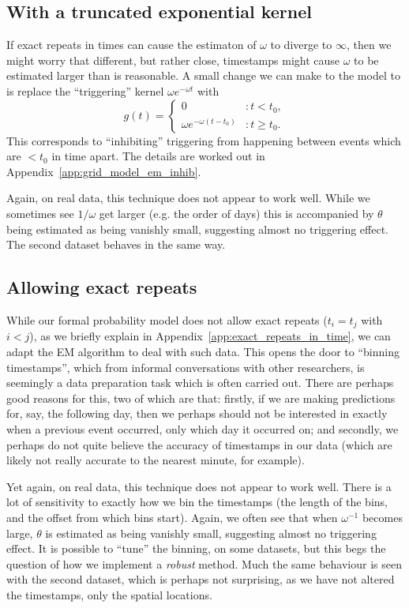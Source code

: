 \documentclass[twoside,a4paper]{article}
\theoremstyle{plain}
\theoremstyle{definition}
\begin{document}
\subsection{With a truncated exponential kernel}

If exact repeats in times can cause the estimaton of $\omega$ to diverge to $\infty$,
then we might worry that different, but rather close, timestamps might cause $\omega$ to
be estimated larger than is reasonable.  A small change we can make to the model to is
replace the ``triggering'' kernel $\omega e^{-\omega t}$ with 
\[ g(t) = \begin{cases} 0 &: t<t_0, \\ \omega e^{-\omega(t-t_0)} &: t\geq t_0.
\end{cases} \]
This corresponds to ``inhibiting'' triggering from happening between events which are
$<t_0$ in time apart.  The details are worked out in Appendix~\ref{app:grid_model_em_inhib}.

Again, on real data, this technique does not appear to work well.  While we sometimes
see $1/\omega$ get larger (e.g. the order of days) this is accompanied by $\theta$ being
estimated as being vanishly small, suggesting almost no triggering effect.
The second dataset behaves in the same way.



\subsection{Allowing exact repeats}\label{sec:exact_repeats}

While our formal probability model does not allow exact repeats ($t_i=t_j$ with $i<j$),
as we briefly explain in Appendix~\ref{app:exact_repeats_in_time}, we can adapt the EM
algorithm to deal with such data.  This opens the door to ``binning timestamps'', which
from informal conversations with other researchers, is seemingly a data preparation task
which is often carried out.  There are perhaps good reasons for this, two of which are
that: firstly, if we are making predictions for, say, the following day, then we perhaps
should not be interested in exactly when a previous event occurred, only which day it
occurred on; and secondly, we perhaps do not quite believe the accuracy of timestamps in
our data (which are likely not really accurate to the nearest minute, for example).

Yet again, on real data, this technique does not appear to work well.  There is a lot of
sensitivity to exactly how we bin the timestamps (the length of the bins, and the offset
from which bins start).  Again, we often see that when $\omega^{-1}$ becomes large,
$\theta$ is estimated as being vanishly small, suggesting almost no triggering effect.
It is possible to ``tune'' the binning, on some datasets, but this begs the question of
how we implement a \emph{robust} method.  Much the same behaviour is seen with the second
dataset, which is perhaps not surprising, as we have not altered the timestamps, only the
spatial locations.
\end{document}
